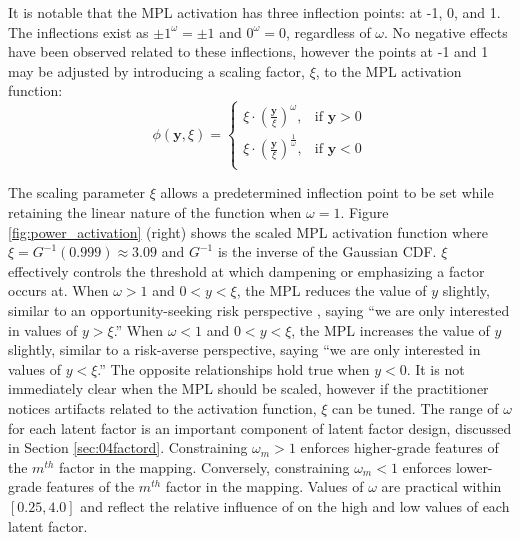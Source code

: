 It is notable that the \gls{MPL} activation has three inflection points: at -1, 0, and 1. The inflections exist as $\pm 1^{\omega} = \pm 1$ and $0^{\omega} = 0$, regardless of $\omega$. No negative effects have been observed related to these inflections, however the points at -1 and 1 may be adjusted by introducing a scaling factor, $\xi$, to the \gls{MPL} activation function:
\begin{equation}
    \phi \left( \mathbf{y}, \xi \right) =
    \begin{cases}
        \xi \cdot \left(\frac{\mathbf{y}}{\xi}\right)^{\omega},           & \text{if $\mathbf{y} > 0$} \\
        \xi \cdot \left(\frac{\mathbf{y}}{\xi}\right)^{\frac{1}{\omega}}, & \text{if $\mathbf{y} < 0$} \\
    \end{cases}
    \label{eq:power_scale}
\end{equation}

The scaling parameter $\xi$ allows a predetermined inflection point to be set while retaining the linear nature of the function when $\omega = 1$. Figure \ref{fig:power_activation} (right) shows the scaled \gls{MPL} activation function where $\xi = G^{-1}(0.999) \approx 3.09$ and $G^{-1}$ is the inverse of the Gaussian \gls{CDF}. $\xi$ effectively controls the threshold at which dampening or emphasizing a factor occurs at. When $\omega > 1$ and $0 < y < \xi$, the \gls{MPL} reduces the value of $y$ slightly, similar to an opportunity-seeking risk perspective \citep{eidsvik2015value}, saying ``we are only interested in values of $y > \xi$.'' When $\omega < 1$ and $0 < y < \xi$, the \gls{MPL} increases the value of $y$ slightly, similar to a risk-averse perspective, saying ``we are only interested in values of $y < \xi$.'' The opposite relationships hold true when $y < 0$. It is not immediately clear when the \gls{MPL} should be scaled, however if the practitioner notices artifacts related to the activation function, $\xi$ can be tuned. The range of $\omega$ for each latent factor is an important component of latent factor design, discussed in Section \ref{sec:04factord}. Constraining $\omega_{m} > 1$ enforces higher-grade features of the $m^{th}$ factor in the mapping. Conversely, constraining $\omega_{m} < 1$ enforces lower-grade features of the $m^{th}$ factor in the mapping. Values of $\omega$ are practical within $[0.25, 4.0]$ and reflect the relative influence of on the high and low values of each latent factor.


